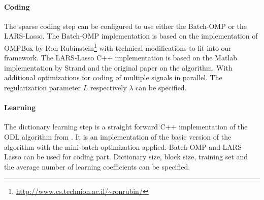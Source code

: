\paragraph{Coding}
The sparse coding step can be configured to use either the Batch-OMP 
or the LARS-Lasso.
The Batch-OMP implementation is based on the implementation
of OMPBox by Ron
Rubinstein\footnote{\url{http://www.cs.technion.ac.il/~ronrubin/}} with
technical modifications to fit into our
framework. The LARS-Lasso C++ implementation is based on the Matlab
implementation by Strand\cite{Strand2005} and the original
paper\cite{Efron2004} on the algorithm. With additional optimizations
for coding of multiple signals in parallel. The regularization parameter $L$
respectively $\lambda$ can be specified. 

\paragraph{Learning}
The dictionary learning step is a straight forward C++ implementation of the
ODL algorithm from . It is an
implementation of the basic version of the algorithm with the mini-batch
optimization applied. Batch-OMP and LARS-Lasso can be used for coding part.
Dictionary size, block size, training set and the average number of learning
coefficients can be specified.

